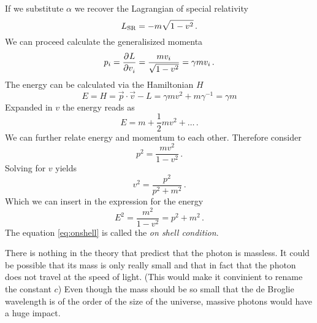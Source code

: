 If we substitute $\alpha$ we recover the Lagrangian of special relativity
\begin{equation}
L\textsubscript{SR}=-m\sqrt{1-v^2}\, .
\end{equation}
We can proceed calculate the generalisized momenta
\begin{equation}
p_i=\dpd{L}{v_i}=\frac{mv_i}{\sqrt{1-v^2}}=\gamma m v_i\, .
\end{equation}
The energy can be calculated via the Hamiltonian $H$
\begin{equation}
E=H=\vec{p}\cdot\vec{v}-L=\gamma m v^2 + m\gamma^{-1} =\gamma m
\end{equation}
Expanded in $v$ the energy reads as
\begin{equation}
E=m+\frac{1}{2}mv^2+\ldots\, .
\end{equation}
We can further relate energy and momentum to each other. Therefore consider 
\begin{equation}
p^2=\frac{mv^2}{1-v^2}\, .
\end{equation}
Solving for $v$ yields
\begin{equation}
v^2=\frac{p^2}{p^2+m^2}\, .
\end{equation}
Which we can insert in the expression for the energy
\begin{equation}
E^2=\frac{m^2}{1-v^2}=p^2+m^2 \label{eq:onshell}\, .
\end{equation}
The equation \eqref{eq:onshell} is called the \emph{on shell condition}.
\begin{sidenote}
There is nothing in the theory that predicst that the photon is massless. It
could be possible that its mass is only really small and that in fact that the
photon does not travel at the speed of light. (This would make it
convinient to rename the constant $c$) Even though the mass should be so small
that the de Broglie wavelength is of the order of the size of the universe,
massive photons would have a huge impact.
\end{sidenote}
